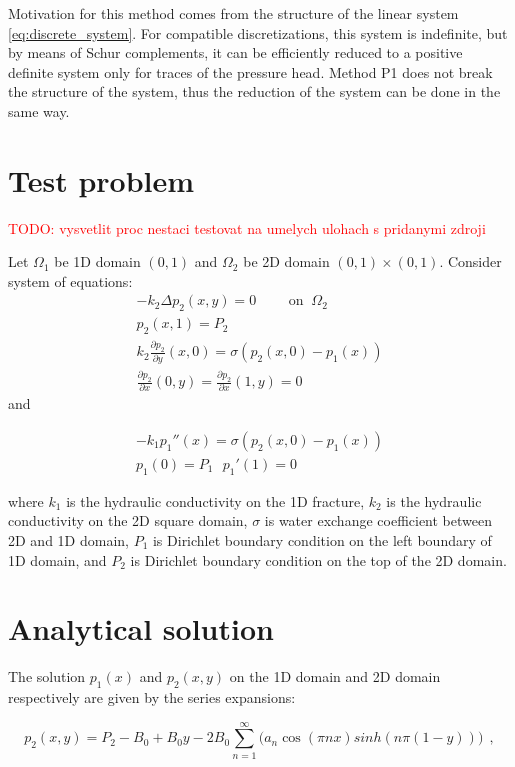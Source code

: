 \documentclass[times]{nlaauth}%
\def\Laplace{\Delta}
\def\prtl{\partial}                                        %
\def\todo#1{\textcolor{red}{TODO: #1} }
\begin{document}
Motivation for this method comes from the structure of the linear system \eqref{eq:discrete_system}. For compatible discretizations, 
this system is indefinite, but by means of Schur complements, it can be efficiently reduced to a positive definite system only 
for traces of the pressure head.
Method P1 does not break the structure of the system, thus the reduction of the system can be done in the same way.

\section{Test problem}
\todo{vysvetlit proc nestaci testovat na umelych ulohach s pridanymi zdroji}

Let $\Omega_1$ be 1D domain $(0,1)$ and $\Omega_2$ be 2D domain $(0,1)\times(0,1)$. Consider system of equations:
\begin{gather}
 -k_2 \Laplace p_2(x,y) = 0 \qquad \text{ on }\ \Omega_2\\
 p_2(x,1) = P_2\\
 k_2 \frac{\prtl p_2}{\prtl y}(x,0) = \sigma ( p_2(x,0) - p_1(x)) \\
\frac{\partial p_2}{\partial x}(0,y) = \frac{\partial p_2}{\partial x}(1,y) = 0
\end{gather}
\vskip -5mm
and 

\begin{gather}
 -k_1 p_1''(x) = \sigma(p_2(x,0) - p_1(x))\\
  p_1(0) = P_1 \ \ \ 
  p_1'(1) = 0
\end{gather}

\noindent
where $k_1$ is the hydraulic conductivity on the 1D fracture, $k_2$ is the hydraulic conductivity 
on the 2D square domain,
$\sigma$ is water exchange coefficient between 2D and 1D domain,
$P_1$ is Dirichlet boundary condition on the left boundary of 1D domain, 
and $P_2$ is Dirichlet boundary condition on the top of the 2D domain.

\section{Analytical solution}




The solution $p_1(x)$ and $p_2(x,y)$ on the 1D domain and 2D domain respectively are given by the series expansions:

\[
  p_2(x,y) = P_2 -B_0 +B_0y -2 B_0\sum_{n=1}^\infty \big( a_n \cos(\pi n x) sinh (n\pi(1-y)) \big ) \ \ ,
\]
\end{document}
